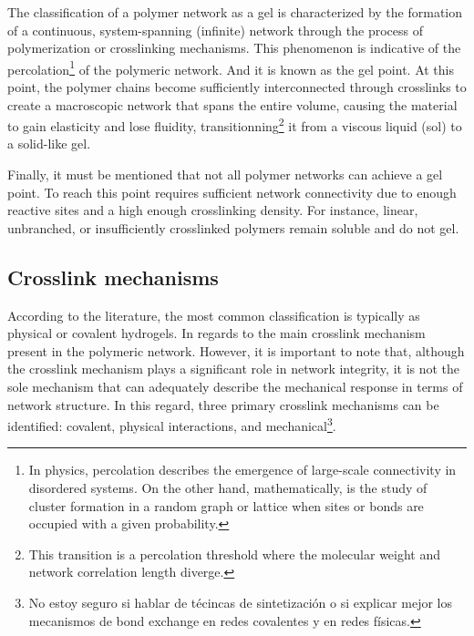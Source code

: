 The classification of a polymer network as a gel is characterized by the formation of a continuous, system-spanning (infinite) network through the process of polymerization or crosslinking mechanisms.
This phenomenon is indicative of the percolation\footnote{In physics, percolation describes the emergence of large-scale connectivity in disordered systems. On the other hand, mathematically, is the study of cluster formation in a random graph or lattice when sites or bonds are occupied with a given probability.} of the polymeric network.
And it is known as the gel point\citep{guPolymerNetworksPlastics2020}.
At this point, the polymer chains become sufficiently interconnected through crosslinks to create a macroscopic network that spans the entire volume, causing the material to gain elasticity and lose fluidity, transitionning\footnote{This transition is a percolation threshold where the molecular weight and network correlation length diverge.} it from a viscous liquid (sol) to a solid-like gel.

Finally, it must be mentioned that not all polymer networks can achieve a gel point.
To reach this point requires sufficient network connectivity due to enough reactive sites and a high enough crosslinking density.
For instance, linear, unbranched, or insufficiently crosslinked polymers remain soluble and do not gel.

\subsection{Crosslink mechanisms}

According to the literature, the most common classification is typically as physical or covalent hydrogels.
In regards to the main crosslink mechanism present in the polymeric network.
However, it is important to note that, although the crosslink mechanism plays a significant role in network integrity, it is not the sole mechanism that can adequately describe the mechanical response in terms of network structure.
In this regard, three primary crosslink mechanisms can be identified: covalent, physical interactions, and mechanical\footnote{No estoy seguro si hablar de técincas de sintetización o si explicar mejor los mecanismos de bond exchange en redes covalentes y en redes físicas.}\citep{bustamantetorresHydrogelsClassificationAccording2021}.

